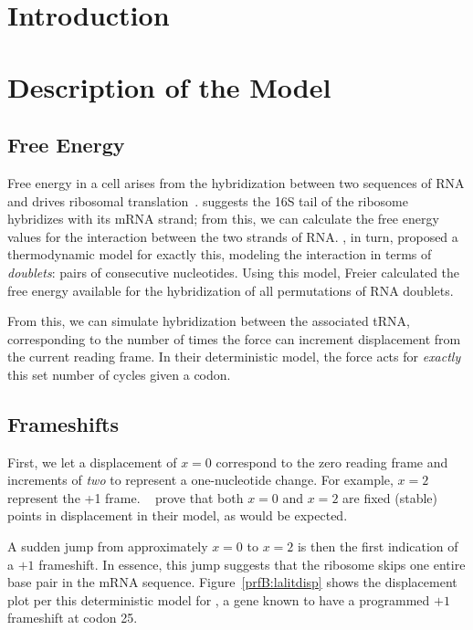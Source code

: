 \documentclass[12pt, draft]{article}
\numberwithin{equation}{section}
\begin{document}
\section{Introduction}

\section{Description of the Model}
\label{allmodel}
\subsection{Free Energy}
\label{freeenergy}

Free energy in a cell arises from the hybridization between two
sequences of RNA and drives ribosomal translation~\cite{starmer}.
\citet{weiss88} suggests the 16S tail of the ribosome hybridizes with its mRNA strand;
from this, we can calculate the free energy values for the interaction between the two strands of RNA.
\citet{freier}, in turn, proposed a thermodynamic model for exactly this,
modeling the interaction in terms of \emph{doublets}: pairs of consecutive nucleotides.
Using this model, Freier calculated the free energy available
for the hybridization of all permutations of RNA doublets.

From this, we can simulate hybridization between the associated tRNA, corresponding to the number
of times the force can increment displacement from the current reading frame.
In their deterministic model, the force acts for \emph{exactly} this set number of cycles given a codon.

\subsection{Frameshifts}


First, we let a displacement of $x = 0$ correspond to the zero reading frame and increments of
\emph{two} to represent a one-nucleotide change. For example, $x =2$ represent the +1 frame.
~\citeauthor{lalit:embs} prove that both $x = 0$ and $x = 2$ are fixed (stable) points in displacement in their model,
as would be expected.

A sudden jump from approximately $x = 0$ to $x = 2$ is then the first indication of a $+1$ frameshift.
In essence, this jump suggests that the ribosome skips one entire base pair in the mRNA sequence.
Figure~\ref{prfB:lalitdisp} shows the displacement plot per this deterministic model for \prfB, 
a gene known to have a programmed $+1$ frameshift at codon 25.
\end{document}
